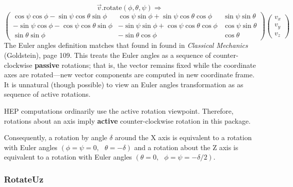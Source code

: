 \documentclass[twoside,12pt]{article}
\begin{document}
\[  \vec{v}.\mbox{rotate}(\phi, \theta, \psi) \Longrightarrow  \]
\begin{equation}
\label{eq:eulerrot}
\left(
\begin{array}{ccc}
\cos \psi \cos \phi - \sin \psi \cos \theta \sin \phi &
\cos \psi \sin \phi + \sin \psi \cos \theta \cos \phi &
\sin \psi \sin \theta \\
- \sin \psi \cos \phi - \cos \psi \cos \theta \sin \phi &
- \sin \psi \sin \phi + \cos \psi \cos \theta \cos \phi &
\cos \psi \sin \theta \\
\sin \theta \sin \phi &
- \sin \theta \cos \phi &
\cos \theta
\end{array}
\right)
\left(
\begin{array}{c}
v_x\\
v_y\\
v_z
\end{array}
\right)
\end{equation}
\noindent
The Euler angles definition matches that found in found in
{\em Classical Mechanics} (Goldstein), page 109.
This treats the Euler angles as a sequence of counter-clockwise {\bf passive}
rotations;
that is, the vector remains fixed while the coordinate axes are rotated---new
vector components are computed in new coordinate frame.
It is unnatural (though possible) to view an Euler angles transformation as
as sequence of active rotations.

HEP computations ordinarily use the active rotation viewpoint.
Therefore, rotations about an axis imply {\bf active} counter-clockwise
rotation in this package. 

Consequently, a rotation by angle $\delta$ around the X axis is
equivalent to a rotation with Euler angles
$(\phi=\psi=0, \mbox{ } \theta = - \delta)$
and a rotation about the Z axis is
equivalent to a rotation with Euler angles
$(\theta = 0, \mbox{ } \phi=\psi= - \delta/2)$.

\subsubsection{RotateUz}
\end{document}
